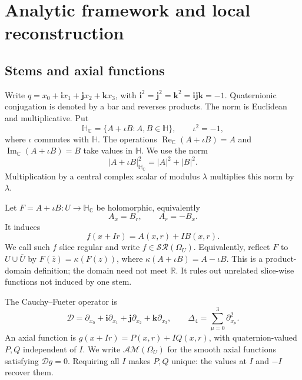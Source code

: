 \documentclass[11pt,a4paper]{article}
\numberwithin{equation}{section}
\theoremstyle{definition}
\theoremstyle{remark}
\newcommand{\R}{\mathbb R}
\newcommand{\C}{\mathbb C}
\newcommand{\HH}{\mathbb H}
\newcommand{\HC}{\mathbb H_{\C}}
\newcommand{\SR}{\mathcal{SR}}
\newcommand{\AM}{\mathcal{AM}}
\newcommand{\Fu}{\Delta_4}
\newcommand{\Dir}{\mathcal D}
\newcommand{\ReC}{\operatorname{Re}_{\C}}
\newcommand{\ImC}{\operatorname{Im}_{\C}}
\newcommand{\ii}{\mathbf i}
\newcommand{\jj}{\mathbf j}
\newcommand{\kk}{\mathbf k}
\begin{document}
\section{Analytic framework and local reconstruction}
\label{sec:framework}
\subsection{Stems and axial functions}
Write $q=x_0+\ii x_1+\jj x_2+\kk x_3$, with
$\ii^2=\jj^2=\kk^2=\ii\jj\kk=-1$.
Quaternionic conjugation is denoted by a bar and reverses products.
The norm is Euclidean and multiplicative. Put
\[
 \HC=\{A+\iota B:A,B\in\HH\},\qquad \iota^2=-1,
\]
where $\iota$ commutes with $\HH$. The operations
$\ReC(A+\iota B)=A$ and $\ImC(A+\iota B)=B$ take values in $\HH$.
We use the norm
\[
 |A+\iota B|_{\HC}^2=|A|^2+|B|^2.
\]
Multiplication by a central complex scalar of modulus $\lambda$ multiplies
this norm by $\lambda$.

Let $F=A+\iota B:U\to\HC$ be holomorphic, equivalently
\begin{equation}
 A_x=B_r,\qquad A_r=-B_x.\label{eq:CR}
\end{equation}
It induces
\begin{equation}
 f(x+Ir)=A(x,r)+IB(x,r).\label{eq:induced}
\end{equation}
We call such $f$ slice regular and write $f\in\SR(\Omega_U)$.
Equivalently, reflect $F$ to $U\cup\overline U$ by
$F(\bar z)=\kappa(F(z))$, where $\kappa(A+\iota B)=A-\iota B$.
This is a product-domain definition; the domain need not meet $\R$.
It rules out unrelated slice-wise functions not induced by one stem.

The Cauchy--Fueter operator is
\[
 \Dir=\partial_{x_0}+\ii\partial_{x_1}
                   +\jj\partial_{x_2}+\kk\partial_{x_3},
 \qquad \Fu=\sum_{\mu=0}^3\partial_{x_\mu}^2.
\]
An axial function is $g(x+Ir)=P(x,r)+IQ(x,r)$, with quaternion-valued
$P,Q$ independent of $I$. We write $\AM(\Omega_U)$ for the smooth axial
functions satisfying $\Dir g=0$. Requiring all $I$ makes $P,Q$ unique:
the values at $I$ and $-I$ recover them.
\end{document}
